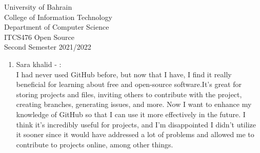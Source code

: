 \documentclass[12pt]{article}
\begin{document}
   \begin{enumerate}
   {\Large University of Bahrain}\\
   College of Information Technology\\
   Department of Computer Science\\
   ITCS476 Open Source\\
   Second Semester 2021/2022\\[0.2cm]
 

\bigskip
   \renewcommand{\arraystretch}{1.4}   %
   
   \end{enumerate}

\begin{enumerate}
  \item Sara khalid - :\\
   I had never used GitHub before, but now that I have, I find it really beneficial for learning about free and open-source software.It's great for storing projects and files, inviting others to contribute with the project, creating branches, generating issues, and more. Now I want to enhance my knowledge of GitHub so that I can use it more effectively in the future. I think it's incredibly useful for projects, and I'm disappointed I didn't utilize it sooner since it would have addressed a lot of problems and allowed me to contribute to projects online, among other things.\\
      
\end{enumerate}
\end{document}
